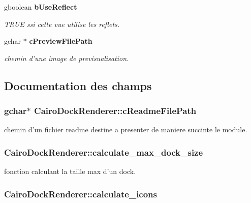 \begin{CompactItemize}
gboolean {\bf bUseReflect}
\begin{CompactList}\small\item\em TRUE ssi cette vue utilise les reflets. \item\end{CompactList}\item 
gchar $\ast$ {\bf cPreviewFilePath}
\begin{CompactList}\small\item\em chemin d'une image de previsualisation. \item\end{CompactList}\end{CompactItemize}


\subsection{Documentation des champs}
\subsubsection{\setlength{\rightskip}{0pt plus 5cm}gchar$\ast$ {\bf CairoDockRenderer::cReadmeFilePath}}\label{structCairoDockRenderer_708f9f322d5f7fa3ac8ff611a3d1dd5e}


chemin d'un fichier readme destine a presenter de maniere succinte le module. 

\subsubsection{ {\bf CairoDockRenderer::calculate\_\-max\_\-dock\_\-size}}\label{structCairoDockRenderer_962311c033d2a27c3730b040d78816eb}


fonction calculant la taille max d'un dock. 

\subsubsection{ {\bf CairoDockRenderer::calculate\_\-icons}}\label{structCairoDockRenderer_97894a90d7a9f63b69bc1c0b92dad7d4}


